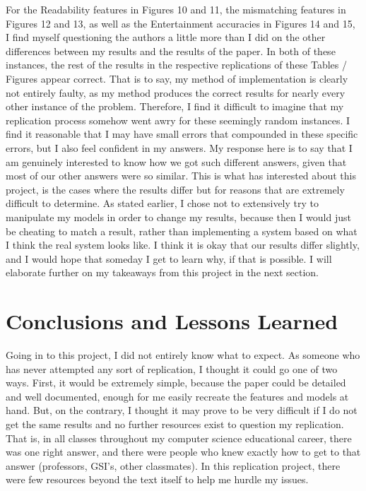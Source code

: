 \documentclass{article}
\begin{document}
For the Readability features in Figures 10 and 11, the mismatching features in Figures 12 and 13, as well as the Entertainment accuracies in Figures 14 and 15, I find myself questioning the authors a little more than I did on the other differences between my results and the results of the paper. In both of these instances, the rest of the results in the respective replications of these Tables / Figures appear correct. That is to say, my method of implementation is clearly not entirely faulty, as my method produces the correct results for nearly every other instance of the problem. Therefore, I find it difficult to imagine that my replication process somehow went awry for these seemingly random instances. I find it reasonable that I may have small errors that compounded in these specific errors, but I also feel confident in my answers. My response here is to say that I am genuinely interested to know how we got such different answers, given that most of our other answers were so similar. This is what has interested about this project, is the cases where the results differ but for reasons that are extremely difficult to determine. As stated earlier, I chose not to extensively try to manipulate my models in order to change my results, because then I would just be cheating to match a result, rather than implementing a system based on what I think the real system looks like. I think it is okay that our results differ slightly, and I would hope that someday I get to learn why, if that is possible. I will elaborate further on my takeaways from this project in the next section.

\section{Conclusions and Lessons Learned}

Going in to this project, I did not entirely know what to expect. As someone who has never attempted any sort of replication, I thought it could go one of two ways. First, it would be extremely simple, because the paper could be detailed and well documented, enough for me easily recreate the features and models at hand. But, on the contrary, I thought it may prove to be very difficult if I do not get the same results and no further resources exist to question my replication. That is, in all classes throughout my computer science educational career, there was one right answer, and there were people who knew exactly how to get to that answer (professors, GSI's, other classmates). In this replication project, there were few resources beyond the text itself to help me hurdle my issues.
\end{document}
